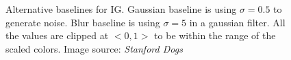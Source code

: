 \begin{figure}[h]
 \caption{Alternative baselines for IG. Gaussian baseline is using $\sigma = 0.5$ to generate noise. Blur baseline is using $\sigma = 5$ in a gaussian filter. All the values are clipped at $<0,1>$ to be within the range of the scaled colors. Image source: \textit{Stanford Dogs} \cite{stanford-dogs} }\label{fig:ig-alternative baselines}
\end{figure}